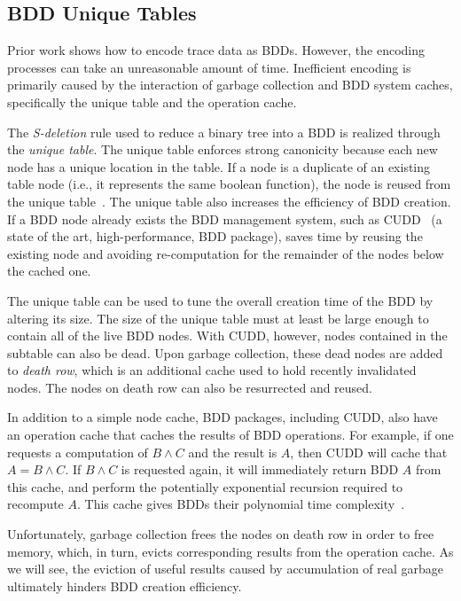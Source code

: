 \documentclass[defaultstyle,11pt]{thesis}
\begin{document}
\subsection{BDD Unique Tables}

Prior work shows how to encode trace data as BDDs.  However, the
encoding processes can take an unreasonable amount of time.
Inefficient encoding is primarily caused by the interaction of garbage
collection and BDD system caches, specifically the unique table and
the operation cache.

The \textit{S-deletion} rule used to reduce a binary tree into a BDD is
realized through the \textit{unique table}.  The unique table enforces
strong canonicity because each new node has a unique location in the
table.  If a node is a duplicate of an existing table node (i.e., it
represents the same boolean function), the node is reused from the
unique table~\cite{bryant:86:ieeetc}. The unique table also increases
the efficiency of BDD creation.  If a BDD node already exists the BDD
management system, such as CUDD~\cite{somenzi:09:cu} (a state of the
art, high-performance, BDD package), saves time by reusing the
existing node and avoiding re-computation for the remainder of the
nodes below the cached one.

The unique table can be used to tune the overall creation time of the
BDD by altering its size.  The size of the unique table must at least
be large enough to contain all of the live BDD nodes.  With CUDD,
however, nodes contained in the subtable can also be dead. Upon
garbage collection, these dead nodes are added to \textit{death row},
which is an additional cache used to hold recently invalidated nodes.
The nodes on death row can also be resurrected and reused.

In addition to a simple node cache, BDD packages, including CUDD, also
have an operation cache that caches the results of BDD operations.
For example, if one requests a computation of $B \land C$ and the
result is $A$, then CUDD will cache that $A = B \land C$.  If $B \land
C$ is requested again, it will immediately return BDD $A$ from this
cache, and perform the potentially exponential recursion required to
recompute $A$.  This cache gives BDDs their polynomial time
complexity~\cite{bryant:86:ieeetc}.

Unfortunately, garbage collection frees the nodes on death row in
order to free memory, which, in turn, evicts corresponding results
from the operation cache.  As we will see, the eviction of useful
results caused by accumulation of real garbage ultimately hinders BDD
creation efficiency.
\end{document}
